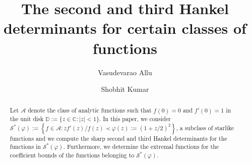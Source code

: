 \documentclass[a4paper,12pt,reqno]{amsart} %
\numberwithin{equation}{section}
\theoremstyle{definition}
\begin{document}
\title{{The second and third Hankel determinants for certain classes of functions}}

\author{Vasudevarao Allu}
\address{Vasudevarao Allu,
Department of Mathematics,
School of Basic Sciences,
Indian Institute of Technology Bhubaneswar,
Bhubaneswar-752050, Odisha, India.}

\author{Shobhit Kumar}
\address{Shobhit Kumar,
Department of Mathematics,
School of Basic Sciences,
Indian Institute of Technology Bhubaneswar,
Bhubaneswar-752050, Odisha, India.}



\def\thefootnote{}
\footnotetext{
{ }
}
\makeatletter\def\thefootnote{\@arabic\c@footnote}\makeatother
\begin{abstract}
Let  $\mathcal{A}$ denote the class of analytic functions such that $f(0)=0$ and $f'(0)=1$ in the unit disk $\mathbb{D}:=\{z \in \mathbb{C}: |z|<1\}.$
In this paper, we consider  $\mathcal{S}^*(\varphi) := \left\{ f \in \mathcal{A} : zf'(z)/f(z) \prec \varphi(z):=(1+z/2)^2 \right\}$, a subclass of starlike functions and we compute the sharp second and third Hankel determinants for the functions in $\mathcal{S}^*(\varphi)$. Furthermore, we determine the extremal functions for the coefficient bounds of  the functions belonging to $\mathcal{S}^*(\varphi)$.
\end{abstract}
\maketitle
\pagestyle{myheadings}
\end{document}
